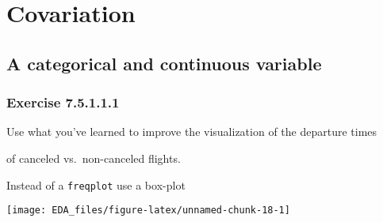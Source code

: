 \documentclass[]{book}
\newenvironment{Shaded}{\begin{snugshade}}{\end{snugshade}}
\newcommand{\DataTypeTok}[1]{\textcolor[rgb]{0.13,0.29,0.53}{#1}}
\newcommand{\DecValTok}[1]{\textcolor[rgb]{0.00,0.00,0.81}{#1}}
\newcommand{\KeywordTok}[1]{\textcolor[rgb]{0.13,0.29,0.53}{\textbf{#1}}}
\newcommand{\NormalTok}[1]{#1}
\newcommand{\OperatorTok}[1]{\textcolor[rgb]{0.81,0.36,0.00}{\textbf{#1}}}
\newcommand{\StringTok}[1]{\textcolor[rgb]{0.31,0.60,0.02}{#1}}
\theoremstyle{plain}
\theoremstyle{remark}
\begin{document}
\hypertarget{covariation}{%
\section{Covariation}\label{covariation}}

\hypertarget{a-categorical-and-continuous-variable}{%
\subsection{A categorical and continuous
variable}\label{a-categorical-and-continuous-variable}}

\hypertarget{exercise-7.5.1.1.1}{%
\subsubsection*{\texorpdfstring{Exercise
{7.5.1.1.1}}{Exercise 7.5.1.1.1}}\label{exercise-7.5.1.1.1}}

Use what you've learned to improve the visualization of the departure
times

of canceled vs.~non-canceled flights.

Instead of a \texttt{freqplot} use a box-plot

\begin{Shaded}
\end{Shaded}

\begin{center}\texttt{[image: EDA\_files/figure-latex/unnamed-chunk-18-1]} \end{center}
\end{document}
